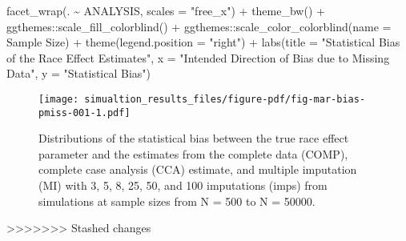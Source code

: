 \documentclass[
  letterpaper,
  DIV=11,
  numbers=noendperiod]{scrartcl}
\newenvironment{Shaded}{\begin{snugshade}}{\end{snugshade}}
\newcommand{\AttributeTok}[1]{\textcolor[rgb]{0.40,0.45,0.13}{#1}}
\newcommand{\FunctionTok}[1]{\textcolor[rgb]{0.28,0.35,0.67}{#1}}
\newcommand{\NormalTok}[1]{\textcolor[rgb]{0.00,0.23,0.31}{#1}}
\newcommand{\SpecialCharTok}[1]{\textcolor[rgb]{0.37,0.37,0.37}{#1}}
\newcommand{\StringTok}[1]{\textcolor[rgb]{0.13,0.47,0.30}{#1}}
\begin{document}
\begin{Shaded}
\begin{Highlighting}[]
        \FunctionTok{facet\_wrap}\NormalTok{(. }\SpecialCharTok{\textasciitilde{}}\NormalTok{ ANALYSIS, }\AttributeTok{scales =} \StringTok{"free\_x"}\NormalTok{) }\SpecialCharTok{+}
        \FunctionTok{theme\_bw}\NormalTok{() }\SpecialCharTok{+}
\NormalTok{        ggthemes}\SpecialCharTok{::}\FunctionTok{scale\_fill\_colorblind}\NormalTok{() }\SpecialCharTok{+}
\NormalTok{        ggthemes}\SpecialCharTok{::}\FunctionTok{scale\_color\_colorblind}\NormalTok{(}\AttributeTok{name =} \StringTok{\textquotesingle{}Sample Size\textquotesingle{}}\NormalTok{) }\SpecialCharTok{+}
        \FunctionTok{theme}\NormalTok{(}\AttributeTok{legend.position =} \StringTok{"right"}\NormalTok{) }\SpecialCharTok{+}
        \FunctionTok{labs}\NormalTok{(}\AttributeTok{title =} \StringTok{"Statistical Bias of the Race Effect Estimates"}\NormalTok{, }
             \AttributeTok{x =} \StringTok{"Intended Direction of Bias due to Missing Data"}\NormalTok{,}
             \AttributeTok{y =} \StringTok{"Statistical Bias"}\NormalTok{)}
\end{Highlighting}
\end{Shaded}

\begin{figure}[H]

{\centering \texttt{[image: simualtion\_results\_files/figure-pdf/fig-mar-bias-pmiss-001-1.pdf]}

}

\caption{\label{fig-mar-bias-pmiss-001}Distributions of the statistical
bias between the true race effect parameter and the estimates from the
complete data (COMP), complete case analysis (CCA) estimate, and
multiple imputation (MI) with 3, 5, 8, 25, 50, and 100 imputations
(imps) from simulations at sample sizes from N = 500 to N = 50000.}

\end{figure}

>>>>>>> Stashed changes
\end{document}
